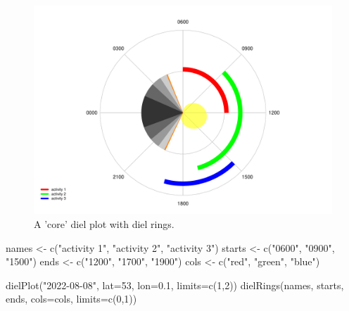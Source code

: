 \documentclass[
]{book}
\newenvironment{Shaded}{\begin{snugshade}}{\end{snugshade}}
\newcommand{\AttributeTok}[1]{\textcolor[rgb]{0.77,0.63,0.00}{#1}}
\newcommand{\DecValTok}[1]{\textcolor[rgb]{0.00,0.00,0.81}{#1}}
\newcommand{\FloatTok}[1]{\textcolor[rgb]{0.00,0.00,0.81}{#1}}
\newcommand{\FunctionTok}[1]{\textcolor[rgb]{0.00,0.00,0.00}{#1}}
\newcommand{\NormalTok}[1]{#1}
\newcommand{\OtherTok}[1]{\textcolor[rgb]{0.56,0.35,0.01}{#1}}
\newcommand{\StringTok}[1]{\textcolor[rgb]{0.31,0.60,0.02}{#1}}
\begin{document}
\begin{figure}

{\centering \includegraphics[width=0.9\linewidth]{_main_files/figure-latex/diel-plot-rings-1-1} 

}

\caption{A 'core' diel plot with diel rings.}\label{fig:diel-plot-rings-1}
\end{figure}

\begin{Shaded}
\begin{Highlighting}[]
\NormalTok{names }\OtherTok{\textless{}{-}} \FunctionTok{c}\NormalTok{(}\StringTok{"activity 1"}\NormalTok{, }\StringTok{"activity 2"}\NormalTok{, }\StringTok{"activity 3"}\NormalTok{)}
\NormalTok{starts }\OtherTok{\textless{}{-}} \FunctionTok{c}\NormalTok{(}\StringTok{"0600"}\NormalTok{, }\StringTok{"0900"}\NormalTok{, }\StringTok{"1500"}\NormalTok{)}
\NormalTok{ends }\OtherTok{\textless{}{-}} \FunctionTok{c}\NormalTok{(}\StringTok{"1200"}\NormalTok{, }\StringTok{"1700"}\NormalTok{, }\StringTok{"1900"}\NormalTok{)}
\NormalTok{cols }\OtherTok{\textless{}{-}} \FunctionTok{c}\NormalTok{(}\StringTok{"red"}\NormalTok{, }\StringTok{"green"}\NormalTok{, }\StringTok{"blue"}\NormalTok{)}

\FunctionTok{dielPlot}\NormalTok{(}\StringTok{"2022{-}08{-}08"}\NormalTok{, }\AttributeTok{lat=}\DecValTok{53}\NormalTok{, }\AttributeTok{lon=}\FloatTok{0.1}\NormalTok{, }\AttributeTok{limits=}\FunctionTok{c}\NormalTok{(}\DecValTok{1}\NormalTok{,}\DecValTok{2}\NormalTok{))}
\FunctionTok{dielRings}\NormalTok{(names, starts, ends, }\AttributeTok{cols=}\NormalTok{cols, }\AttributeTok{limits=}\FunctionTok{c}\NormalTok{(}\DecValTok{0}\NormalTok{,}\DecValTok{1}\NormalTok{))}
\end{Highlighting}
\end{Shaded}
\end{document}
